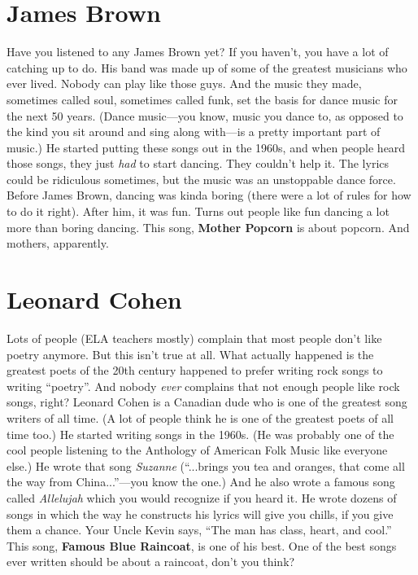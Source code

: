\documentclass[letterpaper,single]{article}
\begin{document}
\section{James Brown}
Have you listened to any James Brown yet? 
If you haven't, you have a lot of catching up to do. 
His band was made up of some of the greatest musicians who ever lived. 
Nobody can play like those guys. 
And the music they made, sometimes called soul, sometimes called funk, set the basis for dance music for the next 50 years. 
(Dance music---you know, music you dance to, as opposed to the kind you sit around and sing along with---is a pretty important part of music.) 
He started putting these songs out in the 1960s, and when people heard those songs, they just \emph{had} to start dancing. 
They couldn't help it. 
The lyrics could be ridiculous sometimes, but the music was an unstoppable dance force.
Before James Brown, dancing was kinda boring (there were a lot of rules for how to do it right). 
After him, it was fun. 
Turns out people like fun dancing a lot more than boring dancing.
This song, \textbf{Mother Popcorn} is about popcorn. And mothers, apparently.

\section{Leonard Cohen}
Lots of people (ELA teachers mostly) complain that most people don't like poetry anymore. 
But this isn't true at all. 
What actually happened is the greatest poets of the 20th century happened to prefer writing rock songs to writing ``poetry''. 
And nobody \emph{ever} complains that not enough people like rock songs, right? 
Leonard Cohen is a Canadian dude who is one of the greatest song writers of all time. 
(A lot of people think he is one of the greatest poets of all time too.) 
He started writing songs in the 1960s. 
(He was probably one of the cool people listening to the Anthology of American Folk Music like everyone else.) 
He wrote that song \emph{Suzanne} (``...brings you tea and oranges, that come all the way from China...''---you know the one.) 
And he also wrote a famous song called \emph{Allelujah} which you would recognize if you heard it. 
He wrote dozens of songs in which the way he constructs his lyrics will give you chills, if you give them a chance. 
Your Uncle Kevin says, ``The man has class, heart, and cool.''
This song, \textbf{Famous Blue Raincoat}, is one of his best.
One of the best songs ever written should be about a raincoat, don't you think?
\end{document}
